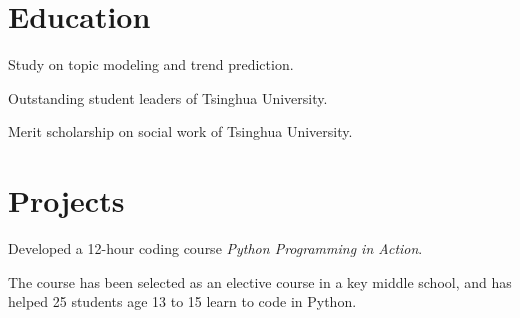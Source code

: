 \documentclass[a4paper]{rukh-cv}
\begin{document}
\begin{minipage}[t]{0.74\textwidth} %


\section{Education}

\vspace{\topsep}
\begin{tightitemize}
\item Study on topic modeling and trend prediction.
\end{tightitemize}

\sectionspace


\begin{tightitemize}
\item Outstanding student leaders of Tsinghua University.
\item Merit scholarship on social work of Tsinghua University.
\end{tightitemize}

\sectionspace


\section{Projects}

\begin{tightitemize}
\item Developed a 12-hour coding course \emph{Python Programming in Action}.
\item The course has been selected as an elective course in a key middle school, and has helped 25 students age 13 to 15 learn to code in Python.
\end{tightitemize}


\end{minipage}
\end{document}
